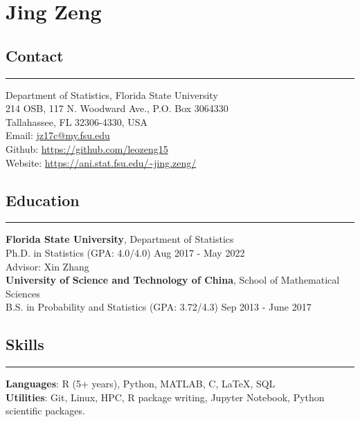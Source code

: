 \documentclass[10pt, oneside]{article}
\title{\vspace{-5em}}
\date{}
\begin{document}
\maketitle

\section*{Jing Zeng}
\vspace{10pt}

\subsection*{Contact}
\noindent\rule{\textwidth}{1pt}
Department of Statistics, Florida State University\\
214 OSB, 117 N. Woodward Ave., P.O. Box 3064330\\
Tallahassee, FL 32306-4330, USA\\
Email: \href{mailto:jz17c@my.fsu.edu}{jz17c@my.fsu.edu}\\
Github: \url{https://github.com/leozeng15}\\
Website: \url{https://ani.stat.fsu.edu/~jing.zeng/}

\subsection*{Education}
\noindent\rule{\textwidth}{1pt}
\textbf{Florida State University}, Department of Statistics\\
Ph.D. in Statistics (GPA: 4.0/4.0) \hfill Aug 2017 - May 2022\\
Advisor: Xin Zhang\\[-10pt]

\textbf{University of Science and Technology of China}, School of Mathematical Sciences\\
B.S. in Probability and Statistics (GPA: 3.72/4.3) \hfill Sep 2013 - June 2017

\subsection*{Skills}
\noindent\rule{\textwidth}{1pt}
\textbf{Languages}: R (5+ years), Python, MATLAB, C, LaTeX, SQL\\[-10pt]

\textbf{Utilities}: Git, Linux, HPC, R package writing, Jupyter Notebook, Python scientific packages.
\end{document}
